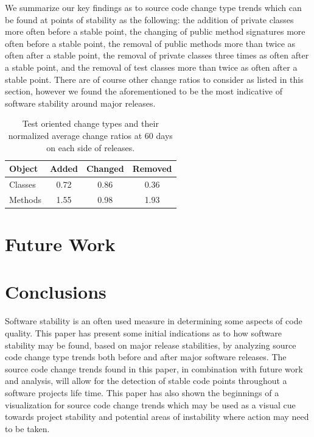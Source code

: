 \documentclass[conference]{IEEEtran}
\begin{document}
We summarize our key findings as to source code change type trends which can be found at points of stability as the following: the addition of private classes more often
before a stable point, the changing of public method signatures more often before a stable point, the removal of public methods more than twice as often
after a stable point, the removal of private classes three times as often after a stable point, and the removal of test classes more than twice as often after
a stable point. There are of course other change ratios to consider as listed in this section, however we found the aforementioned to be the most indicative of 
software stability around major releases.

\begin{table}[h]
\begin{center}
\begin{tabular}{| l | c | c | c |}
\hline
Object & Added & Changed & Removed\\
\hline
Classes & 0.72 & 0.86 & 0.36 \\
Methods & 1.55 & 0.98 & 1.93 \\
\hline
\end{tabular}
\end{center}
\caption{Test oriented change types and their normalized average change ratios at 60 days on each side of releases. \label{tab:test}}
\end{table}

\section{Future Work}

\section{Conclusions}

Software stability is an often used measure in determining some aspects of code quality. This paper has present some initial indications as to how
software stability may be found, based on major release stabilities, by analyzing source code change type trends both before and after major software
releases. The source code change trends found in this paper, in combination with future work and analysis, will allow for the detection of stable code
points throughout a software projects life time. This paper has also shown the beginnings of a visualization for source code change trends which may
be used as a visual cue towards project stability and potential areas of instability where action may need to be taken.

\end{document}
